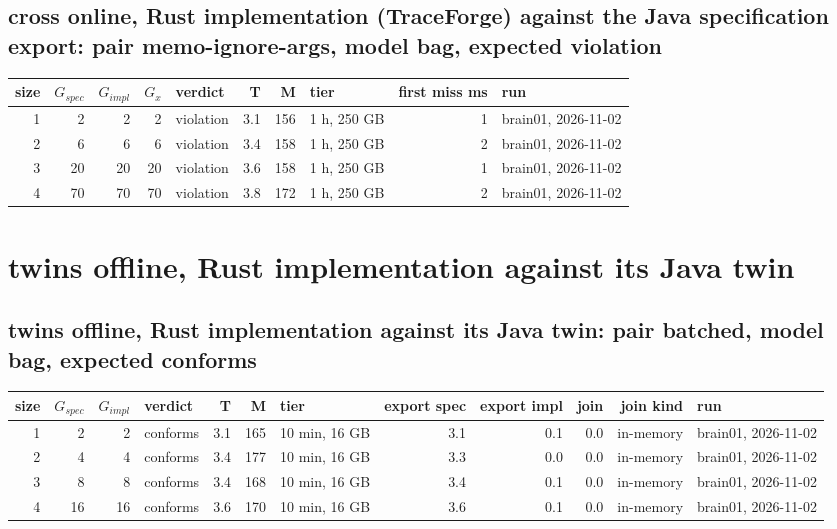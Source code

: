 \documentclass[10pt]{article}
\begin{document}
\subsection*{cross online, Rust implementation (TraceForge) against the Java specification export: pair \textsf{memo-ignore-args}, model bag, expected violation}
\begin{longtable}{@{}rrrrlrrlrl@{}}
\toprule
size & $G_{\mathit{spec}}$ & $G_{\mathit{impl}}$ & $G_x$ & verdict & T & M & tier & first miss ms & run \\
\midrule
\endhead
\color{red} 1 & 2 & 2 & 2 & violation & 3.1 & 156 & 1 h, 250 GB & 1 & brain01, 2026-11-02 \\
\color{red} 2 & 6 & 6 & 6 & violation & 3.4 & 158 & 1 h, 250 GB & 2 & brain01, 2026-11-02 \\
\color{red} 3 & 20 & 20 & 20 & violation & 3.6 & 158 & 1 h, 250 GB & 1 & brain01, 2026-11-02 \\
\color{red} 4 & 70 & 70 & 70 & violation & 3.8 & 172 & 1 h, 250 GB & 2 & brain01, 2026-11-02 \\
\bottomrule
\end{longtable}
\section*{twins offline, Rust implementation against its Java twin}
\subsection*{twins offline, Rust implementation against its Java twin: pair \textsf{batched}, model bag, expected conforms}
\begin{longtable}{@{}rrrlrrlrrrrl@{}}
\toprule
size & $G_{\mathit{spec}}$ & $G_{\mathit{impl}}$ & verdict & T & M & tier & export spec & export impl & join & join kind & run \\
\midrule
\endhead
\color{red} 1 & 2 & 2 & conforms & 3.1 & 165 & 10 min, 16 GB & 3.1 & 0.1 & 0.0 & in-memory & brain01, 2026-11-02 \\
\color{red} 2 & 4 & 4 & conforms & 3.4 & 177 & 10 min, 16 GB & 3.3 & 0.0 & 0.0 & in-memory & brain01, 2026-11-02 \\
\color{red} 3 & 8 & 8 & conforms & 3.4 & 168 & 10 min, 16 GB & 3.4 & 0.1 & 0.0 & in-memory & brain01, 2026-11-02 \\
\color{red} 4 & 16 & 16 & conforms & 3.6 & 170 & 10 min, 16 GB & 3.6 & 0.1 & 0.0 & in-memory & brain01, 2026-11-02 \\
\bottomrule
\end{longtable}
\end{document}
